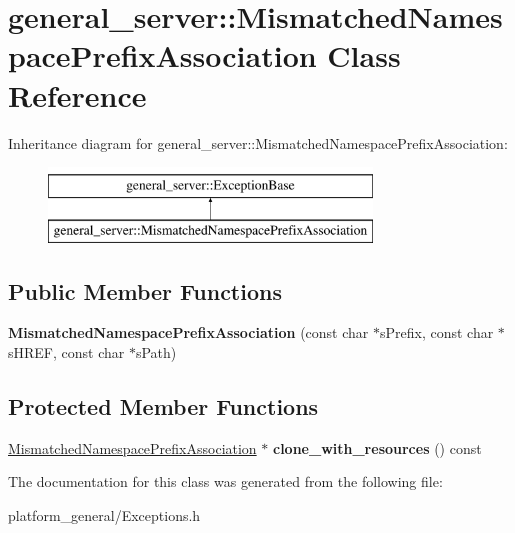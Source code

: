 \hypertarget{classgeneral__server_1_1MismatchedNamespacePrefixAssociation}{\section{general\-\_\-server\-:\-:\-Mismatched\-Namespace\-Prefix\-Association \-Class \-Reference}
\label{classgeneral__server_1_1MismatchedNamespacePrefixAssociation}
}
\-Inheritance diagram for general\-\_\-server\-:\-:\-Mismatched\-Namespace\-Prefix\-Association\-:\begin{figure}[H]
\begin{center}
\leavevmode
\includegraphics[height=2.000000cm]{classgeneral__server_1_1MismatchedNamespacePrefixAssociation}
\end{center}
\end{figure}
\subsection*{\-Public \-Member \-Functions}
\begin{DoxyCompactItemize}
\item 
\hypertarget{classgeneral__server_1_1MismatchedNamespacePrefixAssociation_af2d69439210b6c8700613e424b9b8449}{{\bfseries \-Mismatched\-Namespace\-Prefix\-Association} (const char $\ast$s\-Prefix, const char $\ast$s\-H\-R\-E\-F, const char $\ast$s\-Path)}\label{classgeneral__server_1_1MismatchedNamespacePrefixAssociation_af2d69439210b6c8700613e424b9b8449}

\end{DoxyCompactItemize}
\subsection*{\-Protected \-Member \-Functions}
\begin{DoxyCompactItemize}
\item 
\hypertarget{classgeneral__server_1_1MismatchedNamespacePrefixAssociation_a40e107dbf2f33bb5f090e12d14ec1b36}{\hyperlink{classgeneral__server_1_1MismatchedNamespacePrefixAssociation}{\-Mismatched\-Namespace\-Prefix\-Association} $\ast$ {\bfseries clone\-\_\-with\-\_\-resources} () const }\label{classgeneral__server_1_1MismatchedNamespacePrefixAssociation_a40e107dbf2f33bb5f090e12d14ec1b36}

\end{DoxyCompactItemize}


\-The documentation for this class was generated from the following file\-:\begin{DoxyCompactItemize}
\item 
platform\-\_\-general/\-Exceptions.\-h\end{DoxyCompactItemize}
